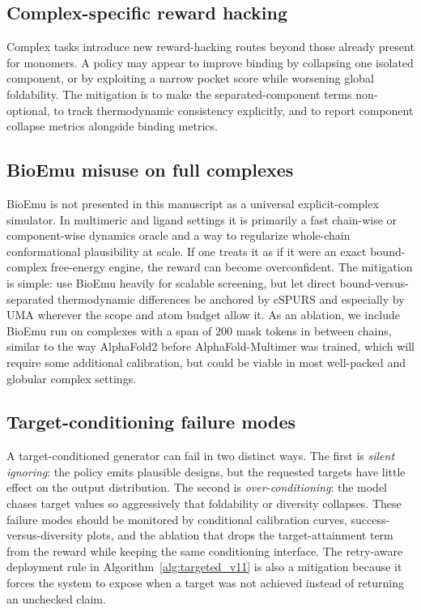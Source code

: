 \documentclass[11pt]{article}
\begin{document}
	
	
	\subsection{Complex-specific reward hacking}
	
	Complex tasks introduce new reward-hacking routes beyond those already present for monomers. A policy may appear to improve binding by collapsing one isolated component, or by exploiting a narrow pocket score while worsening global foldability. The mitigation is to make the separated-component terms non-optional, to track thermodynamic consistency explicitly, and to report component collapse metrics alongside binding metrics.
	
	\subsection{BioEmu misuse on full complexes}
	
	BioEmu is not presented in this manuscript as a universal explicit-complex simulator. In multimeric and ligand settings it is primarily a fast chain-wise or component-wise dynamics oracle and a way to regularize whole-chain conformational plausibility at scale. If one treats it as if it were an exact bound-complex free-energy engine, the reward can become overconfident. The mitigation is simple: use BioEmu heavily for scalable screening, but let direct bound-versus-separated thermodynamic differences be anchored by cSPURS and especially by UMA wherever the scope and atom budget allow it. As an ablation, we include BioEmu run on complexes with a span of $200$ mask tokens in between chains, similar to the way AlphaFold2 before AlphaFold-Multimer was trained, which will require some additional calibration, but could be viable in most well-packed and globular complex settings. 
	
	\subsection{Target-conditioning failure modes}
	
	A target-conditioned generator can fail in two distinct ways. The first is \emph{silent ignoring}: the policy emits plausible designs, but the requested targets have little effect on the output distribution. The second is \emph{over-conditioning}: the model chases target values so aggressively that foldability or diversity collapses. These failure modes should be monitored by conditional calibration curves, success-versus-diversity plots, and the ablation that drops the target-attainment term from the reward while keeping the same conditioning interface. The retry-aware deployment rule in Algorithm~\ref{alg:targeted_v11} is also a mitigation because it forces the system to expose when a target was not achieved instead of returning an unchecked claim.
	
\end{document}
